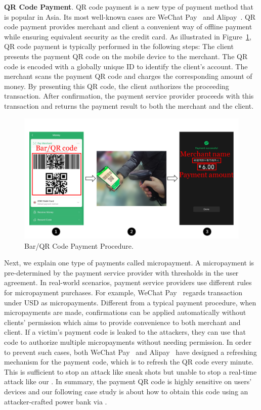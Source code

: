 \textbf{QR Code Payment}.
QR code payment is a new type of payment method that is popular in Asia. Its most well-known cases are WeChat Pay~\cite{Wechat-pay} and Alipay~\cite{AliPay}. QR code payment provides merchant and client a convenient way of offline payment while ensuring equivalent security as the credit card.
As illustrated in Figure~\ref{fig:qr_payment_procedure}, QR code payment is typically performed in the following steps:
 The client presents the payment QR code on the mobile device to the merchant.
The QR code is encoded with a globally unique ID to identify the client's account.
 The merchant scans the payment QR code and charges the corresponding amount of money.
By presenting this QR code, the client authorizes the proceeding transaction.
 After confirmation, the payment service provider proceeds with this transaction and returns the payment result to both the merchant and the client.

\begin{figure}[t]
	\centering
	\includegraphics[width=\linewidth]{./Figs/qr_code_payment.png}
	\caption{Bar/QR Code Payment Procedure.}
	\label{fig:qr_payment_procedure}
\end{figure}


Next, we explain one type of payments called micropayment. A micropayment is pre-determined by the payment
service provider with thresholds in the user agreement. In real-world scenarios, payment service providers use different rules
for micropayment purchases. For example, WeChat
Pay~\cite{Wechat-pay} regards transaction under USD  as
micropayments.  Different from a typical payment procedure, when micropayments
are made, confirmations can be applied automatically without clients'
permission which aims to provide convenience to both merchant and client.  If a
victim's payment code is leaked to the attackers, they can use that code to
authorize multiple micropayments without needing permission.  In order to prevent such
cases, both WeChat Pay~\cite{Wechat-pay} and Alipay~\cite{AliPay} have designed a refreshing mechanism for the
payment code, which is to refresh the QR code every minute. This is sufficient
to stop an attack like sneak shots but unable to stop a real-time attack like our
\tool.  In summary, the payment QR code is highly sensitive on users' devices
and our following case study is about how to obtain this code using an
attacker-crafted power bank via \tool.

